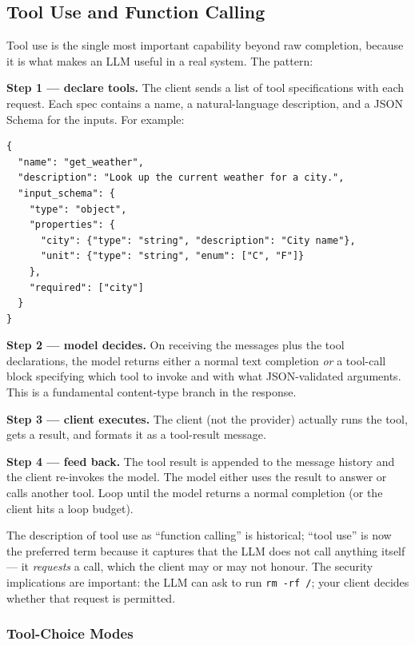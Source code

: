 \subsection{Tool Use and Function Calling}

Tool use is the single most important capability beyond raw
completion, because it is what makes an LLM useful in a real
system. The pattern:

\textbf{Step 1 --- declare tools.} The client sends a list of
tool specifications with each request. Each spec contains a
name, a natural-language description, and a JSON Schema for the
inputs. For example:

\begin{lstlisting}
{
  "name": "get_weather",
  "description": "Look up the current weather for a city.",
  "input_schema": {
    "type": "object",
    "properties": {
      "city": {"type": "string", "description": "City name"},
      "unit": {"type": "string", "enum": ["C", "F"]}
    },
    "required": ["city"]
  }
}
\end{lstlisting}

\textbf{Step 2 --- model decides.} On receiving the messages plus
the tool declarations, the model returns either a normal text
completion \emph{or} a tool-call block specifying which tool to
invoke and with what JSON-validated arguments. This is a
fundamental content-type branch in the response.

\textbf{Step 3 --- client executes.} The client (not the
provider) actually runs the tool, gets a result, and formats it
as a tool-result message.

\textbf{Step 4 --- feed back.} The tool result is appended to the
message history and the client re-invokes the model. The model
either uses the result to answer or calls another tool. Loop
until the model returns a normal completion (or the client hits a
loop budget).

The description of tool use as ``function calling'' is historical;
``tool use'' is now the preferred term because it captures that
the LLM does not call anything itself --- it \emph{requests} a
call, which the client may or may not honour. The security
implications are important: the LLM can ask to run
\texttt{rm -rf /}; your client decides whether that request is
permitted.

\subsubsection{Tool-Choice Modes}

